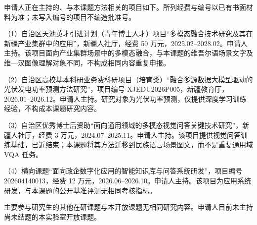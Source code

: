 \justifying
\NSFCBodyText

申请人正在主持的、与本课题方法相关的项目如下。所列经费与编号以已有书面材料为准；未写入编号的项目不编造批准号。

（1）自治区天池英才引进计划（青年博士人才）项目“多模态融合技术研究及其在新疆产业集群中的应用”，新疆人社厅，经费 50 万元，2025.02--2028.02。申请人主持。该项目面向产业集群场景中的多模态融合，与本课题的维吾尔语场景文字及维—汉图像理解对象不同，不构成相同内容重复申报。

（2）自治区高校基本科研业务费科研项目（培育类）“融合多源数据大模型驱动的光伏发电功率预测方法研究”，项目编号 XJEDU2026P005，新疆教育厅，2026.01--2026.12。申请人主持。研究对象为光伏功率预测，仅提供深度学习训练经验，不构成本课题研究内容。

（3）自治区优秀博士后资助“面向通用领域的多模态视觉问答关键技术研究”，新疆人社厅，经费 3 万元，2024.07--2025.11。申请人主持。该项目提供视觉问答训练基础，已近结束；本课题将其方法迁移到民族语言场景图文，而不是重复通用域 VQA 任务。

（4）横向课题“面向政企数字化应用的智能知识库与问答系统研发”，项目编号 202604140013，经费 12 万元，2026.06--2026.10。申请人主持。该项目为应用系统研发，与本课题的公开基准评测无相同考核指标。

主要参与研究生的其他在研课题与本开放课题无相同研究内容。申请人目前未主持尚未结题的本实验室开放课题。
